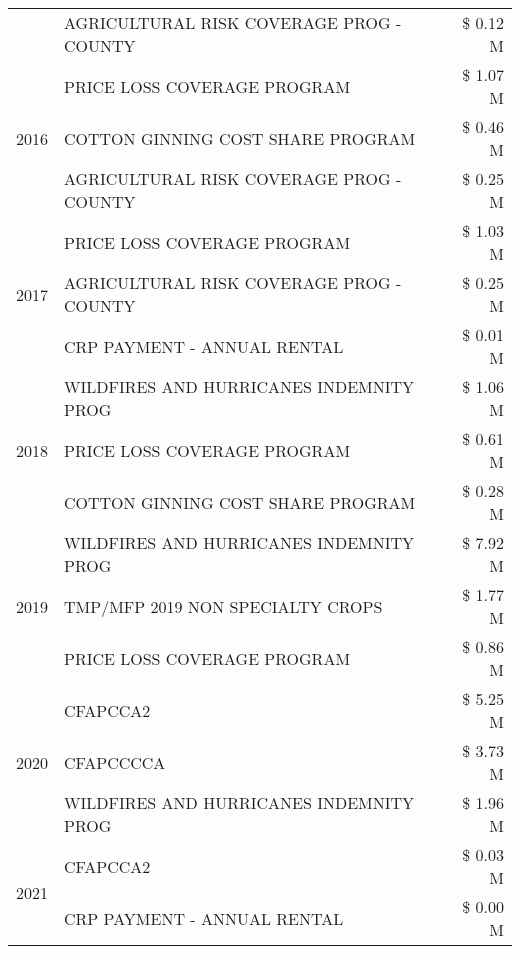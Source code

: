 \begin{tabular}{llr}
 & AGRICULTURAL RISK COVERAGE PROG - COUNTY & \$ 0.12 M \\
\cline{1-3}
\multirow[t]{3}{*}{2016} & PRICE LOSS COVERAGE PROGRAM                   & \$ 1.07 M \\
 & COTTON GINNING COST SHARE PROGRAM             & \$ 0.46 M \\
 & AGRICULTURAL RISK COVERAGE PROG - COUNTY      & \$ 0.25 M \\
\cline{1-3}
\multirow[t]{3}{*}{2017} & PRICE LOSS COVERAGE PROGRAM & \$ 1.03 M \\
 & AGRICULTURAL RISK COVERAGE PROG - COUNTY & \$ 0.25 M \\
 & CRP PAYMENT - ANNUAL RENTAL & \$ 0.01 M \\
\cline{1-3}
\multirow[t]{3}{*}{2018} & WILDFIRES AND HURRICANES INDEMNITY PROG & \$ 1.06 M \\
 & PRICE LOSS COVERAGE PROGRAM & \$ 0.61 M \\
 & COTTON GINNING COST SHARE PROGRAM & \$ 0.28 M \\
\cline{1-3}
\multirow[t]{3}{*}{2019} & WILDFIRES AND HURRICANES INDEMNITY PROG & \$ 7.92 M \\
 & TMP/MFP 2019 NON SPECIALTY CROPS & \$ 1.77 M \\
 & PRICE LOSS COVERAGE PROGRAM & \$ 0.86 M \\
\cline{1-3}
\multirow[t]{3}{*}{2020} & CFAPCCA2 & \$ 5.25 M \\
 & CFAPCCCCA & \$ 3.73 M \\
 & WILDFIRES AND HURRICANES INDEMNITY PROG & \$ 1.96 M \\
\cline{1-3}
\multirow[t]{2}{*}{2021} & CFAPCCA2 & \$ 0.03 M \\
 & CRP PAYMENT - ANNUAL RENTAL & \$ 0.00 M \\
\cline{1-3}
\bottomrule
\end{tabular}
